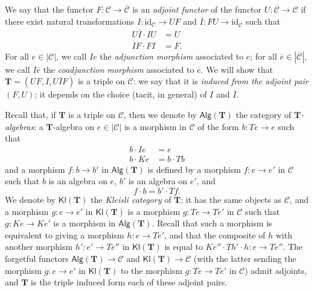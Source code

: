 \documentclass{article}
\newcommand{\oldpage}[1]{\marginpar{\footnotesize$\Big\vert$ \textit{p.~#1}}}
\newcommand{\cat}[1]{\mathcal{#1}}
\newcommand{\Cat}[1]{\mathsf{#1}}
\newcommand{\set}[1]{|#1|}
\newcommand{\id}{\mathrm{id}}
\newcommand{\TT}{\mathbf{T}}
\newcommand{\Alg}[1]{\Cat{Alg}(#1)}
\newcommand{\Kl}[1]{\Cat{Kl}(#1)}
\begin{document}
We say that the functor $F\colon\cat{C}\to\overline{\cat{C}}$ is an \emph{adjoint functor} of the functor $U\colon\overline{\cat{C}}\to\cat{C}$ if there exist natural transformations $I\colon\id_\cat{C}\to UF$ and $\overline{I}\colon FU\to\id_{\overline{\cat{C}}}$ such that
\[
  \begin{aligned}
    U\overline{I}\cdot IU
  & = U
  \\\overline{I}F\cdot FI
  & = F.
  \end{aligned}
  \tag{3}
\]
For all $e\in\set{\cat{C}}$, we call $Ie$ the \emph{adjunction morphism} associated to $e$; for all $\overline{e}\in\set{\overline{\cat{C}}}$, we call $\overline{I}\overline{e}$ the \emph{coadjunction morphism} associated to $\overline{e}$.
We will show that $\TT=(UF,I,U\overline{I}F)$ is a triple on $\cat{C}$: we say that it is \emph{induced from the adjoint pair $(F,U)$};
it depends on the choice (tacit, in general) of $I$ and $\overline{I}$.

Recall that, if $\TT$ is a triple on $\cat{C}$, then we denote by $\Alg{\TT}$ the category of \emph{$\TT$-algebras}: a $\TT$-algebra on $e\in{\set{\cat{C}}}$ is a morphism in $\cat{C}$ of the form $b\colon Te\to e$ such that
\[
  \begin{aligned}
    b\cdot Ie
    &= e
  \\b\cdot Ke
    &= b\cdot Tb
  \end{aligned}
  \tag{4}
\]
and a morphism $f\colon b\to b'$ in $\Alg{\TT}$ is defined by a morphism $f\colon e\to e'$ in $\cat{C}$ such that $b$ is an algebra on $e$, $b'$ is an algebra on $e'$, and
\[
  f\cdot b
  = b'\cdot Tf.
  \tag{5}
\]
We denote by $\Kl{\TT}$ the \emph{Kleisli category} of $\TT$: it has the same objects as $\cat{C}$, and a morphism $g\colon e\to e'$ in $\Kl{\TT}$ is a morphism $g\colon Te\to Te'$ in $\cat{C}$ such that $g\colon Ke\to Ke'$ is a morphism in $\Alg{\TT}$.
\oldpage{224}
Recall that such a morphism is equivalent to giving a morphism $h\colon e\to Te'$, and that the composite of $h$ with another morphism $h'\colon e'\to Te''$ in $\Kl{\TT}$ is equal to $Ke''\cdot Th'\cdot h\colon e\to Te''$.
The forgetful functors $\Alg{\TT}\to\cat{C}$ and $\Kl{\TT}\to\cat{C}$ (with the latter sending the morphism $g\colon e\to e'$ in $\Kl{\TT}$ to the morphism $g\colon Te\to Te'$ in $\cat{C}$) admit adjoints, and $\TT$ is the triple induced form each of these adjoint pairs.
\end{document}
